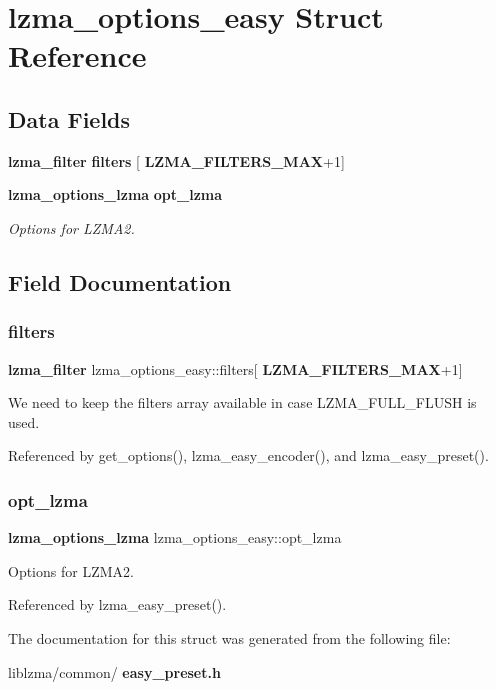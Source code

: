 \section{lzma\+\_\+options\+\_\+easy Struct Reference}
\label{structlzma__options__easy}
\subsection*{Data Fields}
\begin{DoxyCompactItemize}
\item 
\textbf{ lzma\+\_\+filter} \textbf{ filters} [\textbf{ L\+Z\+M\+A\+\_\+\+F\+I\+L\+T\+E\+R\+S\+\_\+\+M\+AX}+1]
\item 
\textbf{ lzma\+\_\+options\+\_\+lzma} \textbf{ opt\+\_\+lzma}
\begin{DoxyCompactList}\small\item\em Options for L\+Z\+M\+A2. \end{DoxyCompactList}\end{DoxyCompactItemize}


\subsection{Field Documentation}
\mbox{\label{structlzma__options__easy_adb657fb0fb484aea2d4a5bc02d1edd00}} 
\subsubsection{filters}
{\footnotesize\ttfamily \textbf{ lzma\+\_\+filter} lzma\+\_\+options\+\_\+easy\+::filters[\textbf{ L\+Z\+M\+A\+\_\+\+F\+I\+L\+T\+E\+R\+S\+\_\+\+M\+AX}+1]}

We need to keep the filters array available in case L\+Z\+M\+A\+\_\+\+F\+U\+L\+L\+\_\+\+F\+L\+U\+SH is used. 

Referenced by get\+\_\+options(), lzma\+\_\+easy\+\_\+encoder(), and lzma\+\_\+easy\+\_\+preset().

\mbox{\label{structlzma__options__easy_a6f10d461b6c969f90b6be9578aa0756e}} 
\subsubsection{opt\+\_\+lzma}
{\footnotesize\ttfamily \textbf{ lzma\+\_\+options\+\_\+lzma} lzma\+\_\+options\+\_\+easy\+::opt\+\_\+lzma}



Options for L\+Z\+M\+A2. 



Referenced by lzma\+\_\+easy\+\_\+preset().



The documentation for this struct was generated from the following file\+:\begin{DoxyCompactItemize}
\item 
liblzma/common/\textbf{ easy\+\_\+preset.\+h}\end{DoxyCompactItemize}
